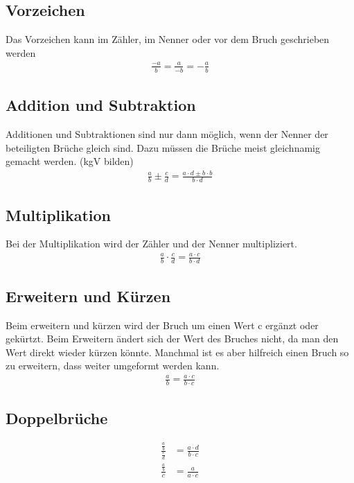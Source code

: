 \subsection{Vorzeichen}
Das Vorzeichen kann im Zähler, im Nenner oder vor dem Bruch geschrieben werden
\begin{align*}
\frac{-a}{b} = \frac{a}{-b} = -\frac{a}{b}
\end{align*}

\subsection{Addition und Subtraktion}
Additionen und Subtraktionen sind nur dann möglich, wenn der Nenner der beteiligten Brüche gleich sind. Dazu müssen die Brüche meist gleichnamig gemacht werden. (kgV bilden) 
\begin{align*}
\frac{a}{b} \pm \frac{c}{d} = \frac{a\cdot d \pm b \cdot b}{b \cdot d}
\end{align*}

\subsection{Multiplikation}
Bei der Multiplikation wird der Zähler und der Nenner multipliziert.
\begin{align*}
\frac{a}{b} \cdot \frac{c}{d} = \frac{a \cdot c}{b \cdot d}
\end{align*}

\subsection{Erweitern und Kürzen}
Beim erweitern und kürzen wird der Bruch um einen Wert c ergänzt oder gekürtzt. Beim Erweitern ändert sich der Wert des Bruches nicht, da man den Wert direkt wieder kürzen könnte. Manchmal ist es aber hilfreich einen Bruch so zu erweitern, dass weiter umgeformt werden kann.
\begin{align*}
\frac{a}{b} = \frac{a \cdot c}{b \cdot c} 
\end{align*}

\subsection{Doppelbrüche}
\begin{align*}
	\frac{\frac{a}{b}}{\frac{c}{d}} &= \frac{a \cdot d}{b \cdot c} \\
	\frac{\frac{a}{b}}{c} &= \frac{a}{a \cdot c} \\
\end{align*}

